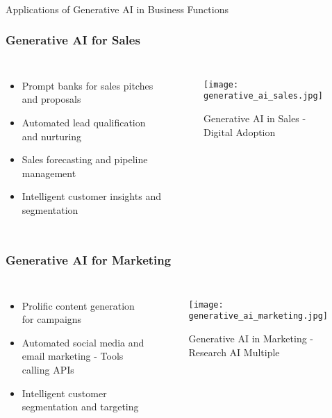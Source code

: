 \begin{frame}[fragile]\frametitle{}
\begin{center}
{\Large Applications of Generative AI in Business Functions}
\end{center}
\end{frame}

\begin{frame}[fragile]\frametitle{Generative AI for Sales}
\begin{columns}
\begin{itemize}
    \item Prompt banks for sales pitches and proposals
    \item Automated lead qualification and nurturing
    \item Sales forecasting and pipeline management
    \item Intelligent customer insights and segmentation
\end{itemize}
\begin{figure}
    \texttt{[image: generative\_ai\_sales.jpg]}
    \caption{Generative AI in Sales - Digital Adoption}
\end{figure}
\end{columns}
\end{frame}

\begin{frame}[fragile]\frametitle{Generative AI for Marketing}
\begin{columns}
\begin{itemize}
    \item Prolific content generation for campaigns
    \item Automated social media and email marketing - Tools calling APIs
    \item Intelligent customer segmentation and targeting
\end{itemize}
\begin{figure}
    \texttt{[image: generative\_ai\_marketing.jpg]}
    \caption{Generative AI in Marketing - Research AI Multiple}
\end{figure}
\end{columns}
\end{frame}

